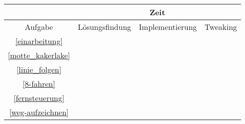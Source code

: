 
\begin{center}
	\begin{tabular}{  c | c | c | c |}
		\cline{2-4}
		& \multicolumn{3}{|c|}{Zeit}  \\ 
		\hline
		\multicolumn{1}{|c|}{Aufgabe} & Lösungsfindung & Implementierung & Tweaking \\
		\hline
		\hline
		\multicolumn{1}{|c|}{\nameref{einarbeitung} \ref{einarbeitung}}  &  &  & \\ 
		\hline
		\multicolumn{1}{|c|}{\nameref{motte_kakerlake} \ref{motte_kakerlake}}  &  &  & \\ 
		\hline
		\multicolumn{1}{|c|}{\nameref{linie_folgen} \ref{linie_folgen}} &  &  & \\ 
		\hline
		\multicolumn{1}{|c|}{\nameref{8-fahren} \ref{8-fahren}} &  &  &\\ 
		\hline
		\multicolumn{1}{|c|}{\nameref{fernsteuerung} \ref{fernsteuerung}} &  &  & \\ 
		\hline
		\multicolumn{1}{|c|}{\nameref{weg-aufzeichnen} \ref{weg-aufzeichnen}} &  &  & \\ 
		\hline
  \end{tabular}
\end{center}
